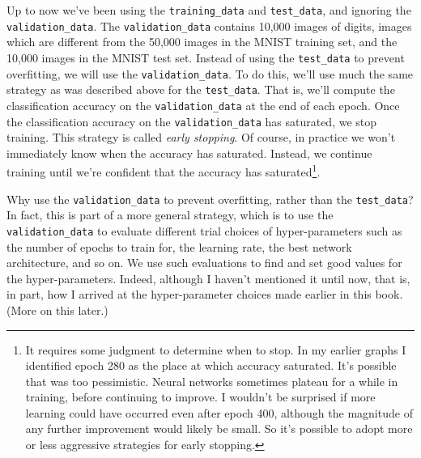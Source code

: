 Up to now we've been using the \lstinline{training_data} and \lstinline{test_data}, and ignoring the \lstinline{validation_data}. The \lstinline{validation_data} contains 10,000 images of digits, images which are different from the 50,000 images in the MNIST training set, and the 10,000 images in the MNIST test set. Instead of using the \lstinline{test_data} to prevent overfitting, we will use the \lstinline{validation_data}. To do this, we'll use much the same strategy as was described above for the \lstinline{test_data}. That is, we'll compute the classification accuracy on the \lstinline{validation_data} at the end of each epoch. Once the classification accuracy on the \lstinline{validation_data} has saturated, we stop training. This strategy is called \textit{early stopping}. Of course, in practice we won't immediately know when the accuracy has saturated. Instead, we continue training until we're confident that the accuracy has saturated\footnote{It requires some judgment to determine when to stop. In my earlier graphs I identified epoch 280 as the place at which accuracy saturated. It's possible that was too pessimistic. Neural networks sometimes plateau for a while in training, before continuing to improve. I wouldn't be surprised if more learning could have occurred even after epoch 400, although the magnitude of any further improvement would likely be small. So it's possible to adopt more or less aggressive strategies for early stopping.}.


Why use the \lstinline{validation_data}\label{page:overfittingvalidationdata} to prevent overfitting, rather than the \lstinline{test_data}? In fact, this is part of a more general strategy, which is to use the \lstinline{validation_data} to evaluate different trial choices of hyper-parameters such as the number of epochs to train for, the learning rate, the best network architecture, and so on. We use such evaluations to find and set good values for the hyper-parameters. Indeed, although I haven't mentioned it until now, that is, in part, how I arrived at the hyper-parameter choices made earlier in this book. (More on this later.)


